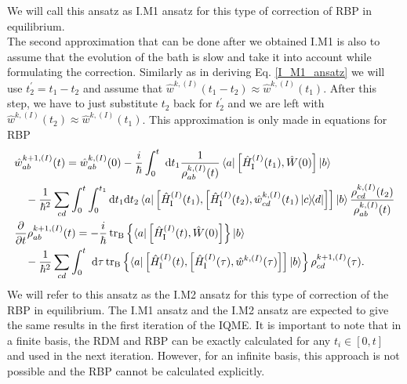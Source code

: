 We will call this ansatz as I.M1 ansatz for this type of correction of RBP in equilibrium. \\
\indent The second approximation that can be done after we obtained I.M1 is also to assume that the evolution of the bath is slow and take it into account while formulating the correction. Similarly as in deriving Eq. \ref{I_M1_ansatz} we will use $t^\prime_2 = t_1 - t_2$ and assume that $\hat{w}^{k, (I)}(t_1-t_2)\approx\hat{w}^{k, (I)}(t_1)$. After this step, we have to just substitute $t_2$ back for $t^\prime_2$ and we are left with $\hat{w}^{k, (I)}(t_2)\approx\hat{w}^{k, (I)}(t_1)$. This approximation is only made in equations for RBP
\begin{equation}
\label{I_M2_ansatz}
    \begin{aligned}
    &\hat{w}^{k+1,(I)}_{ab}(t) = \hat{w}^{k, (I)}_{ab}(0) -\frac{i}{\hbar} \int_{0}^{t} \mathrm{~d} t_1  \frac{1}{\rho^{k, (I)}_{ab}(t)} \bra{a}\left[\hat{H}_{\mathrm{I}}^{(I)}(t_1), \hat{W}(0)\right]\ket{b} \\
     &\quad -\frac{1}{\hbar^{2}} \sum_{cd} \int_{0}^{t} \int_{0}^{t_1} \mathrm{d} t_1 \mathrm{d} t_2 \bra{a} \left[\hat{H}_{\mathrm{I}}^{(I)}(t_1),\left[\hat{H}_{\mathrm{I}}^{(I)}(t_2), \hat{w}^{k, (I)}_{cd}(t_1)  \ketbra{c}{d} \right]\right] \ket{b} \frac{\rho^{k, (I)}_{cd}(t_2) }{ \rho^{k, (I)}_{ab}(t)} \\
     &\frac{\partial}{\partial t} \rho_{ab}^{k+1, (I)}(t)=-\frac{i}{\hbar} \operatorname{tr}_{\mathrm{B}}   \left\{ \bra{a}\left[\hat{H}_{\mathrm{I}}^{(I)}(t), \hat{W}(0)\right]\right\}  \ket{b}\\
     &\quad -\frac{1}{\hbar^{2}} \sum_{cd}\int_{0}^{t} \mathrm{~d}\tau  \operatorname{tr}_{\mathrm{B}}   \left\{ \bra{a} \left[\hat{H}_{\mathrm{I}}^{(I)}(t),\left[\hat{H}_{\mathrm{I}}^{(I)}(\tau), \hat{w}^{k, (I)}(\tau) \right]\right] \ket{b} \right\}   \rho^{k+1,(I)}_{cd}(\tau). 
    \end{aligned}
\end{equation}
We will refer to this ansatz as the I.M2 ansatz for this type of correction of the RBP in equilibrium. The I.M1 ansatz and the I.M2 ansatz are expected to give the same results in the first iteration of the IQME. It is important to note that in a finite basis, the RDM and RBP can be exactly calculated for any $t_i\in [0, t]$ and used in the next iteration. However, for an infinite basis, this approach is not possible and the RBP cannot be calculated explicitly. \\

